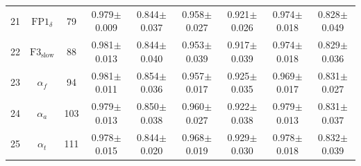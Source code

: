 \documentclass[pdflatex,sn-mathphys]{sn-jnl}%
\theoremstyle{thmstyleone}%
\theoremstyle{thmstyletwo}%
\theoremstyle{thmstylethree}%
\begin{document}
\begin{appendices}
\begin{table}[h!]
{\begin{tabular}{r|cccccccc}
  21 &           $\text{FP1}_{\delta}$ &     79 &          0.979$\pm$0.009 &          0.844$\pm$0.037 &          0.958$\pm$0.027 &          0.921$\pm$0.026 &          0.974$\pm$0.018 &          0.828$\pm$0.049 \\
  22 &         $\text{F3}_\text{slow}$ &     88 &          0.981$\pm$0.013 &          0.844$\pm$0.040 &          0.953$\pm$0.039 &          0.917$\pm$0.039 &          0.974$\pm$0.018 &          0.829$\pm$0.036 \\
  23 &                    $\alpha_{f}$ &     94 &          0.981$\pm$0.011 &          0.854$\pm$0.036 &          0.957$\pm$0.017 &          0.925$\pm$0.035 &          0.969$\pm$0.017 &          0.831$\pm$0.027 \\
  24 &                    $\alpha_{a}$ &    103 &          0.979$\pm$0.013 &          0.850$\pm$0.038 &          0.960$\pm$0.027 &          0.922$\pm$0.038 &          0.979$\pm$0.013 &          0.831$\pm$0.037 \\
  25 &                    $\alpha_{t}$ &    111 &          0.978$\pm$0.015 &          0.844$\pm$0.020 &          0.968$\pm$0.019 &          0.929$\pm$0.030 &          0.978$\pm$0.018 &          0.832$\pm$0.039 \\
\hline
\end{tabular}
}
\end{table}



\end{appendices}

\FloatBarrier



\end{document}
